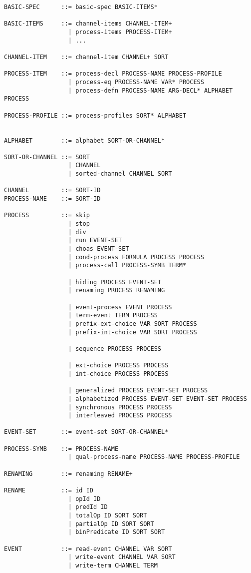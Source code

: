 \begin{verbatim}
BASIC-SPEC      ::= basic-spec BASIC-ITEMS*

BASIC-ITEMS     ::= channel-items CHANNEL-ITEM+
                  | process-items PROCESS-ITEM+
                  | ...

CHANNEL-ITEM    ::= channel-item CHANNEL+ SORT

PROCESS-ITEM    ::= process-decl PROCESS-NAME PROCESS-PROFILE
                  | process-eq PROCESS-NAME VAR* PROCESS
                  | process-defn PROCESS-NAME ARG-DECL* ALPHABET PROCESS

PROCESS-PROFILE ::= process-profiles SORT* ALPHABET


ALPHABET        ::= alphabet SORT-OR-CHANNEL*

SORT-OR-CHANNEL ::= SORT
                  | CHANNEL
                  | sorted-channel CHANNEL SORT

CHANNEL         ::= SORT-ID
PROCESS-NAME    ::= SORT-ID

PROCESS         ::= skip
                  | stop
                  | div
                  | run EVENT-SET
                  | choas EVENT-SET
                  | cond-process FORMULA PROCESS PROCESS
                  | process-call PROCESS-SYMB TERM*

                  | hiding PROCESS EVENT-SET
                  | renaming PROCESS RENAMING

                  | event-process EVENT PROCESS
                  | term-event TERM PROCESS
                  | prefix-ext-choice VAR SORT PROCESS
                  | prefix-int-choice VAR SORT PROCESS

                  | sequence PROCESS PROCESS

                  | ext-choice PROCESS PROCESS
                  | int-choice PROCESS PROCESS

                  | generalized PROCESS EVENT-SET PROCESS
                  | alphabetized PROCESS EVENT-SET EVENT-SET PROCESS
                  | synchronous PROCESS PROCESS
                  | interleaved PROCESS PROCESS

EVENT-SET       ::= event-set SORT-OR-CHANNEL*

PROCESS-SYMB    ::= PROCESS-NAME
                  | qual-process-name PROCESS-NAME PROCESS-PROFILE

RENAMING        ::= renaming RENAME+

RENAME          ::= id ID
                  | opId ID
                  | predId ID
                  | totalOp ID SORT SORT
                  | partialOp ID SORT SORT
                  | binPredicate ID SORT SORT

EVENT           ::= read-event CHANNEL VAR SORT
                  | write-event CHANNEL VAR SORT
                  | write-term CHANNEL TERM
\end{verbatim}
